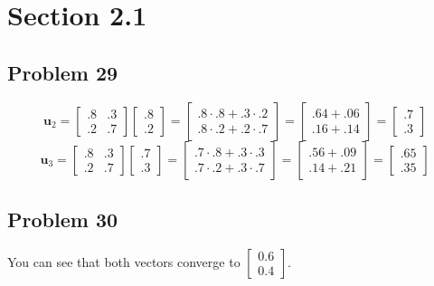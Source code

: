 \documentclass[12pt]{article}
\begin{document}
\section*{Section 2.1}

\subsection*{Problem 29}
\[ 
\boldsymbol{u}_2
=   \begin{bmatrix} .8 & .3 \\ .2 & .7 \end{bmatrix}
    \begin{bmatrix} .8 \\ .2 \end{bmatrix}
= \begin{bmatrix} .8 \cdot .8 + .3 \cdot .2 \\ .8 \cdot .2 + .2 \cdot .7 \end{bmatrix}
= \begin{bmatrix} .64 + .06 \\ .16 + .14 \end{bmatrix}
= \begin{bmatrix} .7 \\ .3 \end{bmatrix}
\]
\[ 
\boldsymbol{u}_3
=   \begin{bmatrix} .8 & .3 \\ .2 & .7 \end{bmatrix}
    \begin{bmatrix} .7 \\ .3 \end{bmatrix}
= \begin{bmatrix} .7 \cdot .8 + .3 \cdot .3 \\ .7 \cdot .2 + .3 \cdot .7 \end{bmatrix}
= \begin{bmatrix} .56 + .09 \\ .14 + .21 \end{bmatrix}
= \begin{bmatrix} .65 \\ .35 \end{bmatrix}
\]

\subsection*{Problem 30}
You can see that both vectors converge to $\begin{bmatrix} 0.6 \\ 0.4 \end{bmatrix}$.
\end{document}
